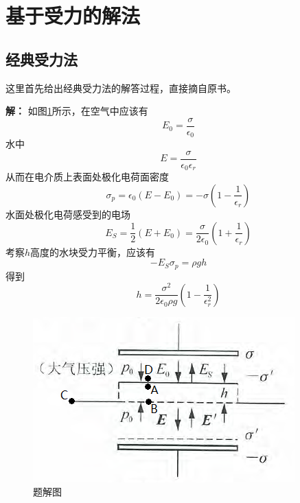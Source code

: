 \documentclass{ctexart}
\newcommand{\epsz}{\epsilon_0}
\newcommand{\epsr}{\epsilon_r}
\begin{document}
	\section{基于受力的解法}
	
	\subsection{经典受力法}\label{sec:ClassicForce}
	
	这里首先给出经典受力法的解答过程，直接摘自原书。
	
	\textbf{解：} 如图\ref{fig:origs}所示，在空气中应该有
	\begin{equation}
	E_0=\frac{\sigma}{\epsz}
	\end{equation}
	水中
	\begin{equation}
	E=\frac{\sigma}{\epsz\epsr}
	\end{equation}
	从而在电介质上表面处极化电荷面密度
	\begin{equation}
	\sigma_p=\epsz(E-E_0)=-\sigma\left(1-\frac{1}{\epsr}\right)
	\end{equation}
	水面处极化电荷感受到的电场
	\begin{equation}
	E_S=\frac{1}{2}(E+E_0)=\frac{\sigma}{2\epsz}\left(1+\frac{1}{\epsr}\right)
	\end{equation}
	考察$h$高度的水块受力平衡，应该有
	\begin{equation}
	-E_S\sigma_p=\rho gh
	\end{equation}
	得到
	\begin{equation}
	h=\frac{\sigma^2}{2\epsz\rho g}\left(1-\frac{1}{\epsr^2}\right)
	\end{equation}
	
	\begin{figure}[htbp!]
		\centering
		\includegraphics{Origs.png}
		\caption{题解图}
		\label{fig:origs}
	\end{figure}
\end{document}
